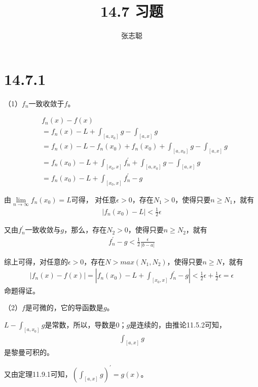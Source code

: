 \documentclass{article}
\begin{document}
\title{14.7 习题}
\author{张志聪}
\maketitle

\section*{14.7.1}
（1）$f_n$一致收敛于$f$。

\begin{align*}
   & f_n(x) - f(x)                                                                     \\
   & = f_n(x) - L + \int_{[a, x_0]} g - \int_{[a, x]} g                                \\
   & = f_n(x) - L - f_n(x_0) + f_n(x_0) + \int_{[a, x_0]} g - \int_{[a, x]} g          \\
   & = f_n(x_0) - L + \int_{[x_0, x]} f^\prime_n + \int_{[a, x_0]} g - \int_{[a, x]} g \\
   & = f_n(x_0) - L + \int_{[x_0, x]} f^\prime_n - g
\end{align*}

由$\lim\limits_{n \to \infty} f_n(x_0) = L$可得，
对任意$\epsilon > 0$，存在$N_1 > 0$，使得只要$n \geq N_1$，就有
\begin{align*}
  |f_n(x_0) - L| < \frac{1}{2}\epsilon
\end{align*}

又由$f_n^\prime$一致收敛与$g$，那么，存在$N_2 > 0$，使得只要$n \geq N_2$，就有
\begin{align*}
  f^\prime_n - g < \frac{1}{2}\frac{\epsilon}{|b - a|}
\end{align*}

综上可得，对任意的$\epsilon > 0$，存在$N > max(N_1, N_2)$，使得只要$n \geq N$，就有
\begin{align*}
  |f_n(x) - f(x)| = |f_n(x_0) - L + \int_{[x_0, x]} f^\prime_n - g| < \frac{1}{2}\epsilon + \frac{1}{2}\epsilon = \epsilon
\end{align*}
命题得证。

（2）$f$是可微的，它的导函数是$g$。

$L - \int_{[a, x_0]} g$是常数，所以，导数是$0$；$g$是连续的，由推论11.5.2可知，
\begin{align*}
  \int_{[a, x]} g
\end{align*}
是黎曼可积的。

又由定理11.9.1可知，$(\int_{[a, x]} g)^\prime = g(x)$。
\end{document}
